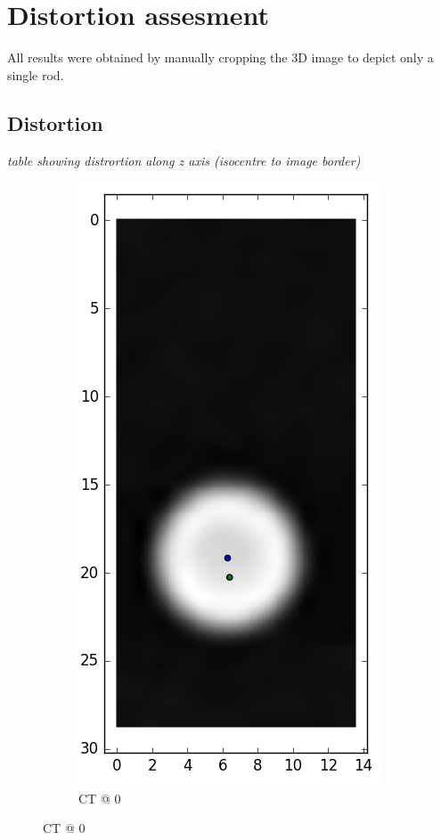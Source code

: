 \documentclass[parskip,bibtotoc,final,twoside=false,titlepage,a4paper,english,12pt,titlepage,a4paper]{scrbook}
\begin{document}
\section{Distortion assesment}
All results were obtained by manually cropping the 3D image to depict only a single rod.
\subsection{Distortion}

\vspace{4cm}
\textit{table showing distrortion along z axis (isocentre to image border)}
\vspace{2cm}

\begin{figure}[!tbp]
  \begin{subfigure}[b]{0.32\textwidth}
    \includegraphics[scale=0.55]{python/centroid/CT_x100@0_centroids.png}
    \caption{CT @ 0}
    \label{fig:CT_x100_centroids@0}

\end{subfigure}
\end{figure}
\end{document}
